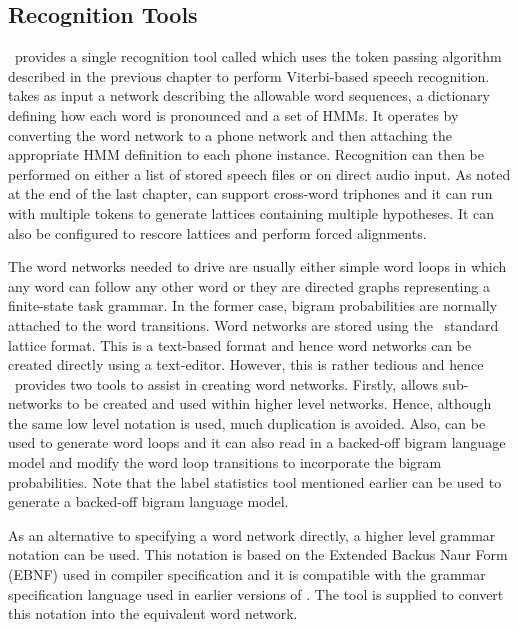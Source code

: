 \subsection{Recognition Tools}

\HTK\ provides a single recognition 
tool called 
which uses the token passing algorithm described in the previous
chapter to perform Viterbi-based speech recognition.  
takes as input a network describing the allowable word sequences,
a dictionary defining how each word is pronounced and a set of HMMs.
It operates by converting the word network to a phone network and
then attaching the appropriate HMM definition to each phone instance.
Recognition can then be performed on either a list of stored speech
files or on direct audio input.  As noted at the end of the last
chapter,  can support cross-word triphones and it can
run with multiple tokens to generate
lattices containing multiple hypotheses.  It can also be configured
to rescore lattices and perform forced alignments.

The word networks needed to drive  are usually either
simple word loops in which any word can follow any other word or they
are directed graphs representing a finite-state task grammar.  In the
former case, bigram probabilities are normally attached to the word
transitions.  Word networks are stored using
the \HTK\ standard lattice format.  
This is a text-based format and
hence word networks can be created directly using a text-editor.
However, this is rather tedious and hence \HTK\ provides two
tools to assist in creating word networks.  Firstly,  
allows sub-networks to be created and used within higher level networks.
Hence, although the same low level notation is used, much duplication
is avoided.  Also,  can be used to generate word loops
and it can also read in a backed-off bigram language model and 
modify the word loop transitions to incorporate the bigram probabilities.
Note that the label statistics tool  mentioned earlier
can be used to generate a backed-off bigram language model.

As an alternative to specifying a word network directly, a higher
level grammar notation can be used.  This notation is based on
the Extended Backus Naur Form (EBNF) used in compiler specification and
it is compatible with the grammar specification language used in 
earlier versions of \HTK.  The 
tool  is supplied
to convert this notation into the equivalent word network.

